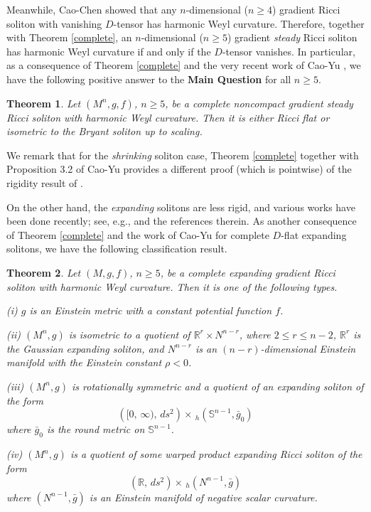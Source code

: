 \documentclass{amsart}
\newtheorem{theorem}{Theorem}[section]
\theoremstyle{definition}
\theoremstyle{remark}
\numberwithin{equation}{section}
\begin{document}
Meanwhile, Cao-Chen \cite{CC2}  showed that any $n$-dimensional ($n\geq 4$) gradient Ricci soliton with vanishing $D$-tensor has harmonic Weyl curvature. Therefore, together with Theorem \ref{complete},  an $n$-dimensional ($n\geq 5$) gradient {\it steady} Ricci soliton has harmonic Weyl curvature if and only if the $D$-tensor vanishes.
In particular, as a consequence of Theorem \ref{complete} and the very recent work of Cao-Yu \cite{CY}, we have the following  positive answer to the \textbf{Main Question} for all $n\ge 5$.  

\begin{theorem} \label{steady}
Let $(M^n, g, f)$, $n\geq 5$, be a complete noncompact gradient steady Ricci soliton with harmonic Weyl curvature. Then it is either Ricci flat or isometric to the Bryant soliton up to scaling.
\end{theorem}

We remark that for the {\it shrinking} soliton case, Theorem \ref{complete} together with Proposition 3.2 of Cao-Yu \cite{CY} provides a different proof (which is pointwise) of the rigidity result of \cite{FG, MS}.

On the other hand, the {\it expanding} solitons are less rigid, and various works have been done recently; see, e.g., \cite{PW, CD, Cho} and the references therein. As another consequence of Theorem \ref{complete} and the work of Cao-Yu \cite{CY} for complete $D$-flat expanding solitons, we have the following classification result.

\begin{theorem} \label{expand}
Let $(M, g,f)$, $n\geq 5$, be a complete expanding gradient Ricci soliton with harmonic Weyl curvature.
Then it is one of the following types.
	
	\smallskip	
	{\rm (i)} $g$ is an Einstein metric with a constant potential function $f$.
	
	\smallskip	
	{\rm (ii)}
	$(M^n, g)$ is isometric to a quotient of 
	$ \mathbb{R}^{r} \times {N}^{n-r}$,
	where $2 \leq r\leq n-2$, $ \mathbb{R}^{r}$ is the Gaussian expanding soliton, and ${N}^{n-r}$ is an $(n-r)$-dimensional Einstein manifold with the Einstein constant $\rho < 0$.	
	
	\smallskip
	{\rm (iii)} $(M^n, g)$ is rotationally  symmetric and a quotient of an expanding soliton of the form
	\[
	\left( [0,\, \infty),\, ds^2 \right) \times \,_h\left(\mathbb{S}^{n-1}, \bar{g}_0\right) 
	\]
    where $\bar{g}_0$ is the round metric on $\mathbb{S}^{n-1}$.

	\smallskip
{\rm (iv)} $(M^n, g)$ is a quotient of some warped product expanding Ricci soliton of the form
	\[
\left(\mathbb{R} ,\, ds^2 \right) \times\, _h\left(N^{n-1}, \bar{g} \right) 
\]
where $\left(N^{n-1}, \bar{g} \right) $ is an Einstein manifold of negative scalar curvature.
\end{theorem}
\end{document}
